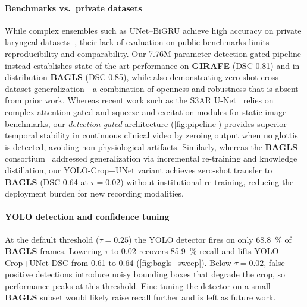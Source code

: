 \documentclass[preprint,12pt]{elsarticle}
\newcommand{\girafe}{\textbf{GIRAFE}}
\newcommand{\bagls}{\textbf{BAGLS}}
\newcommand{\yolocrop}{YOLO-Crop+UNet}
\begin{document}
\paragraph{Benchmarks vs.\ private datasets}
While complex ensembles such as UNet--BiGRU achieve high accuracy on private
laryngeal datasets~\cite{nobel2024ensemble}, their lack of evaluation on public
benchmarks limits reproducibility and comparability.
Our \num{7.76}M-parameter detection-gated pipeline instead establishes
state-of-the-art performance on \girafe{} (DSC \num{0.81}) and
in-distribution \bagls{} (DSC \num{0.85}), while also demonstrating
zero-shot cross-dataset generalization---a combination of openness and
robustness that is absent from prior work.
Whereas recent work such as the S3AR U-Net~\cite{montalbo2024} relies on
complex attention-gated and squeeze-and-excitation modules for static image
benchmarks, our \emph{detection-gated} architecture (\cref{fig:pipeline})
provides superior temporal stability in continuous clinical video by zeroing
output when no glottis is detected, avoiding non-physiological artifacts.
Similarly, whereas the \bagls{} consortium~\cite{dollinger2022} addressed
generalization via incremental re-training and knowledge distillation, our
\yolocrop{} variant achieves zero-shot transfer to \bagls{} (DSC \num{0.64}
at $\tau{=}0.02$) without institutional re-training, reducing the deployment
burden for new recording modalities.

\paragraph{YOLO detection and confidence tuning}
At the default threshold ($\tau{=}0.25$) the YOLO detector fires on
only \SI{68.8}{\%} of \bagls{} frames.
Lowering $\tau$ to \num{0.02} recovers \SI{85.9}{\%} recall and lifts
\yolocrop{} DSC from \num{0.61} to \num{0.64}
(\cref{fig:bagls_sweep}).
Below $\tau{=}0.02$, false-positive detections introduce noisy bounding
boxes that degrade the crop, so performance peaks at this threshold.
Fine-tuning the detector on a small \bagls{} subset would likely raise
recall further and is left as future work.
\end{document}
